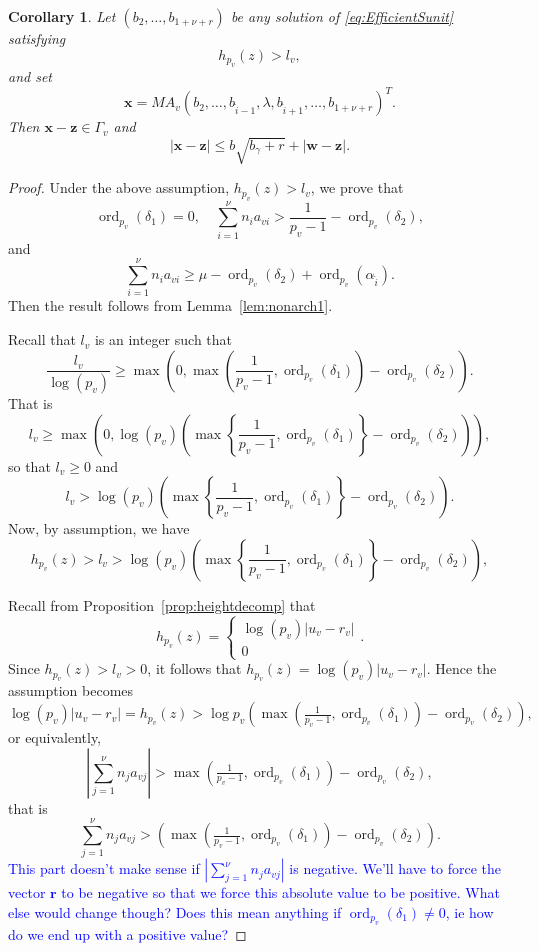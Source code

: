 \documentclass[11pt]{report}
\newtheorem{corollary}[theorem]{Corollary}
\theoremstyle{definition}
\DeclareMathOperator{\ord}{ord}
\newcommand{\edit}[1]{\textcolor{blue}{#1}}
\begin{document}
\begin{corollary} \label{cor:hvequiv}
  Let $(b_2, \dots, b_{1+\nu+r})$ be any solution of \eqref{eq:EfficientSunit} satisfying
  \[h_{p_v}(z) > l_v,\]
  and set
  \[\mathbf{x} = MA_v(b_2, \dots, b_{\hat{i} - 1}, \lambda, b_{\hat{i}+1}, \dots, b_{1+\nu+r})^T.\]
  Then $\mathbf{x} - \mathbf{z} \in \Gamma_{v}$ and
  \[|\mathbf{x} - \mathbf{z}| \leq b\sqrt{b_{\gamma} + r} + |\mathbf{w} - \mathbf{z}|.\]
\end{corollary}

\begin{proof}
  Under the above assumption, $h_{p_v}(z) > l_v$, we prove that
  \[\ord_{p_v}(\delta_1) = 0, \quad \displaystyle \sum_{i = 1}^{\nu} n_{i}a_{vi} > \frac{1}{p_v-1} - \ord_{p_v}(\delta_2),\]
  and
  \[\sum_{i = 1}^{\nu} n_{i}a_{vi}  \geq \mu - \ord_{p_v}(\delta_2) + \ord_{p_v}(\alpha_{\hat{i}}).\]
  Then the result follows from Lemma~\ref{lem:nonarch1}.

  Recall that $l_v$ is an integer such that
  \[\frac{l_v}{\log(p_v)} \geq \max\left(0,\max\left( \frac{1}{p_v-1}, \ord_{p_v}(\delta_1)\right) - \ord_{p_v}(\delta_2)\right).\]
  That is
  \[l_v\geq \max\left(0,\log(p_v)\left(\max\left\{ \frac{1}{p_v-1}, \ord_{p_v}(\delta_1)\right\}
        - \ord_{p_v}(\delta_2)\right)\right),\]
  so that $l_v \geq 0$ and
  \[l_v > \log(p_v)\left(\max\left\{ \frac{1}{p_v-1}, \ord_{p_v}(\delta_1)\right\} -
      \ord_{p_v}(\delta_2)\right).\]
  Now, by assumption, we have
  \[h_{p_v}(z) > l_v > \log(p_v)\left(\max\left\{ \frac{1}{p_v-1}, \ord_{p_v}(\delta_1)\right\} -
      \ord_{p_v}(\delta_2)\right),\]

Recall from Proposition~\ref{prop:heightdecomp} that
\[h_{p_v}(z) =
\begin{cases}
\log(p_v)|u_v - r_v| \\
0
\end{cases}.\]
Since $h_{p_v}(z) > l_v > 0$, it follows that $h_{p_v}(z) = \log(p_v)|u_v - r_v|$. Hence the assumption becomes
\[\log(p_v)|u_v - r_v| = h_{p_v}(z) > \log p_v\left(\max\left(\tfrac{1}{p_v-1},\ord_{p_v}(\delta_1)\right)-\ord_{p_v}(\delta_2)\right),\]
or equivalently,
\[\left|\sum_{j = 1}^{\nu}n_ja_{vj}\right| > \max\left(\tfrac{1}{p_v-1},\ord_{p_v}(\delta_1)\right)-\ord_{p_v}(\delta_2),\]
that is
\[\sum_{j = 1}^{\nu}n_ja_{vj} > \left(\max\left(\tfrac{1}{p_v-1},\ord_{p_v}(\delta_1)\right)-\ord_{p_v}(\delta_2)\right).\]
\edit{This part doesn't make sense if $\left|\sum_{j = 1}^{\nu}n_ja_{vj}\right|$ is negative. We'll have to force the vector $\mathbf{r}$ to be negative so that we force this absolute value to be positive. What else would change though? Does this mean anything if $\ord_{p_v}(\delta_1) \neq 0$, ie how do we end up with a positive value?}


\end{proof}
\end{document}
